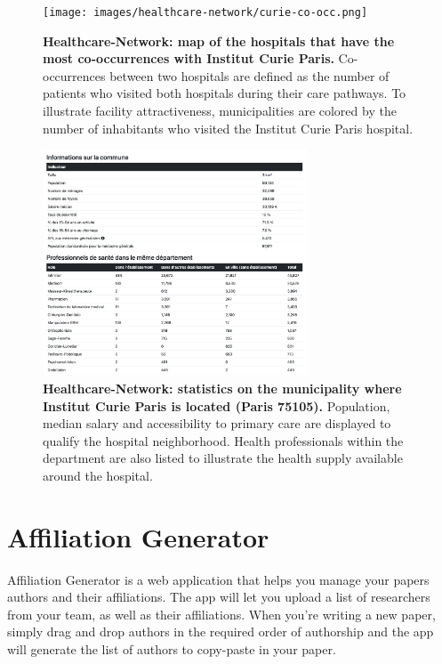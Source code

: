 \begin{figure}[H]
    \texttt{[image: images/healthcare-network/curie-co-occ.png]}
    \centering
    \caption{
        \textbf{Healthcare-Network: map of the hospitals that have the most co-occurrences with Institut Curie Paris.} Co-occurrences between two hospitals are defined as the number of patients who visited both hospitals during their care pathways. To illustrate facility attractiveness, municipalities are colored by the number of inhabitants who visited the Institut Curie Paris hospital.
    }
    \label{fig:hn-curie-co-occ}
\end{figure}


\begin{figure}[H]
    \includegraphics[width=0.7\textwidth]{images/healthcare-network/curie-commune.png}
    \centering
    \caption{
        \textbf{Healthcare-Network: statistics on the municipality where Institut Curie Paris is located (Paris 75105).} Population, median salary and accessibility to primary care are displayed to qualify the hospital neighborhood. Health professionals within the department are also listed to illustrate the health supply available around the hospital.
    }
    \label{fig:hn-curie-commune}
\end{figure}


\section{Affiliation Generator}

Affiliation Generator is a web application that helps you manage your papers authors and their affiliations. The app will let you upload a list of researchers from your team, as well as their affiliations. When you're writing a new paper, simply drag and drop authors in the required order of authorship and the app will generate the list of authors to copy-paste in your paper.

